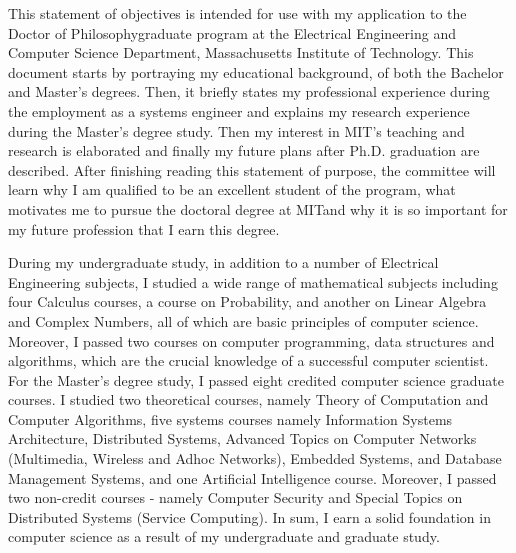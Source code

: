 \documentclass[a4paper,10pt]{report}
\newcommand{\university}{Massachusetts Institute of Technology}
\newcommand{\department}{Electrical Engineering and Computer Science Department}
\newcommand{\uniabbre}{MIT}
\newcommand{\degree}{Doctor of Philosophy}
\begin{document}

\vspace{0.4cm}
This statement of objectives is intended for use with my application to the \degree \space graduate program at the \department, \university. This document starts by portraying my educational background, of both the Bachelor and Master's degrees. Then, it briefly states my professional experience during the employment as a systems engineer and explains my research experience during the Master's degree study. Then my interest in \uniabbre's teaching and research is elaborated and finally my future plans after Ph.D. graduation are described. After finishing reading this statement of purpose, the committee will learn why I am qualified to be an excellent student of the program, what motivates me to pursue the doctoral degree at \uniabbre \space and why it is so important for my future profession that I earn this degree.

\vspace{0.2cm}
During my undergraduate study, in addition to a number of Electrical Engineering subjects, I studied a wide range of mathematical subjects including four Calculus courses, a course on Probability, and another on Linear Algebra and Complex Numbers, all of which are basic principles of computer science. Moreover, I passed two courses on computer programming, data structures and algorithms, which are the crucial knowledge of a successful computer scientist. For the Master's degree study, I passed eight credited computer science graduate courses. I studied two theoretical courses, namely Theory of Computation and Computer Algorithms, five systems courses namely Information Systems Architecture, Distributed Systems, Advanced Topics on Computer Networks (Multimedia, Wireless and Adhoc Networks), Embedded Systems, and Database Management Systems, and one Artificial Intelligence course. Moreover, I passed two non-credit courses - namely Computer Security and Special Topics on Distributed Systems (Service Computing). In sum, I earn a solid foundation in computer science as a result of my undergraduate and graduate study. 
\end{document}
